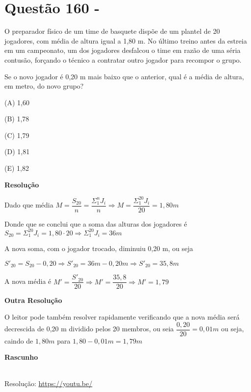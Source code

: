 \section{Questão 160 - }

O preparador físico de um time de basquete dispõe de um plantel de 20 jogadores, com média de altura igual a 1,80 m. No último treino antes da estreia em um campeonato, um dos jogadores desfalcou o time em razão de uma séria contusão, forçando o técnico a contratar outro jogador para recompor o grupo.

Se o novo jogador é 0,20 m mais baixo que o anterior, qual é a média de altura, em metro, do novo grupo?

(A)  1,60

(B)  1,78

(C)  1,79

(D)  1,81

(E)  1,82

\textbf{Resolução}

Dado que média $ M = \dfrac{S_{20}}{n} = \dfrac{\Sigma_{1}^{n} J_{i}}{n} \Rightarrow M = \dfrac{\Sigma_{1}^{20} J_{i}}{20} = 1,80m $

Donde que se conclui que a soma das alturas dos jogadores é $ S_{20} = \Sigma_{1}^{20} J_{i} = 1,80 \cdot 20 \Rightarrow \Sigma_{1}^{20} J_{i} = 36m $

A nova soma, com o jogador trocado, diminuiu 0,20 m, ou seja

$ S'_{20} = S_{20} - 0,20 \Rightarrow S'_{20} = 36m - 0,20m  \Rightarrow S'_{20} = 35,8m $

A nova média é $ M' = \dfrac{S'_{20}}{20} \Rightarrow  M' = \dfrac{35,8}{20} \Rightarrow  M' = 1,79 $

\textbf{Outra Resolução}

O leitor pode também resolver rapidamente verificando que a nova média será decrescida de 0,20 m dividido pelos 20 membros, ou seia $ \dfrac{0,20}{20} = 0,01m $ ou seja, caindo de $ 1,80m $ para $ 1,80 - 0,01m = 1,79m $ 

\textbf{Rascunho}





\begin{center}
    \href{https://youtu.be/}{
    }\\
    Resolução: \url{https://youtu.be/}
\end{center}
